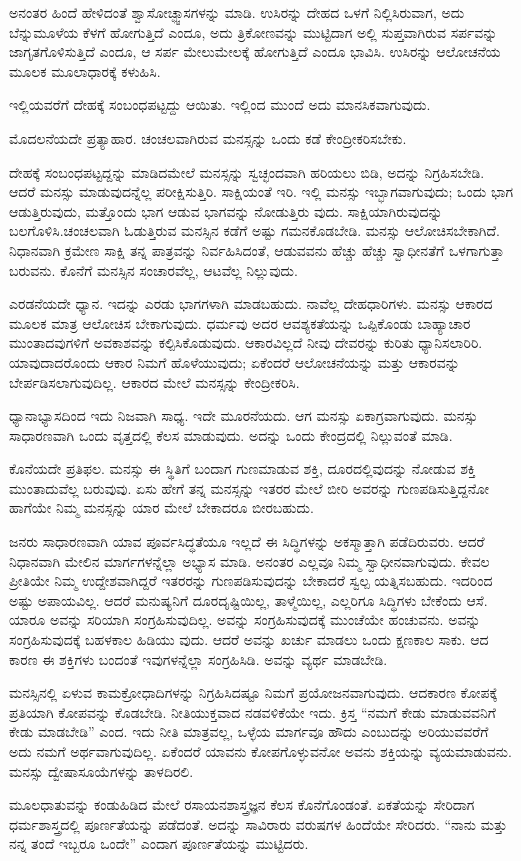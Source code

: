 ಅನಂತರ ಹಿಂದೆ ಹೇಳಿದಂತೆ ಶ್ವಾಸೋಚ್ಫ್ವಾಸಗಳನ್ನು ಮಾಡಿ. ಉಸಿರನ್ನು ದೇಹದ ಒಳಗೆ ನಿಲ್ಲಿಸಿರುವಾಗ, ಅದು ಬೆನ್ನುಮೂಳೆಯ ಕೆಳಗೆ ಹೋಗುತ್ತಿದೆ ಎಂದೂ, ಅದು ತ್ರಿಕೋಣವನ್ನು ಮುಟ್ಟಿದಾಗ ಅಲ್ಲಿ ಸುಪ್ತವಾಗಿರುವ ಸರ್ಪವನ್ನು ಜಾಗೃತಗೊಳಿಸುತ್ತಿದೆ ಎಂದೂ, ಆ ಸರ್ಪ ಮೇಲುಮೇಲಕ್ಕೆ ಹೋಗುತ್ತಿದೆ ಎಂದೂ ಭಾವಿಸಿ. ಉಸಿರನ್ನು ಆಲೋಚನೆಯ ಮೂಲಕ ಮೂಲಾಧಾರಕ್ಕೆ ಕಳುಹಿಸಿ.

ಇಲ್ಲಿಯವರೆಗೆ ದೇಹಕ್ಕೆ ಸಂಬಂಧಪಟ್ಟದ್ದು ಆಯಿತು. ಇಲ್ಲಿಂದ ಮುಂದೆ ಅದು ಮಾನಸಿಕವಾಗುವುದು.

ಮೊದಲನೆಯದೇ ಪ್ರತ್ಯಾಹಾರ. ಚಂಚಲವಾಗಿರುವ ಮನಸ್ಸನ್ನು ಒಂದು ಕಡೆ ಕೇಂದ್ರೀಕರಿಸಬೇಕು.

ದೇಹಕ್ಕೆ ಸಂಬಂಧಪಟ್ಟದ್ದನ್ನು ಮಾಡಿದಮೇಲೆ ಮನಸ್ಸನ್ನು ಸ್ವಚ್ಛಂದವಾಗಿ ಹರಿಯಲು ಬಿಡಿ, ಅದನ್ನು ನಿಗ್ರಹಿಸಬೇಡಿ. ಆದರೆ ಮನಸ್ಸು ಮಾಡುವುದನ್ನೆಲ್ಲ ಪರೀಕ್ಷಿಸುತ್ತಿರಿ. ಸಾಕ್ಷಿಯಂತೆ ಇರಿ. ಇಲ್ಲಿ ಮನಸ್ಸು ಇಬ್ಭಾಗವಾಗುವುದು; ಒಂದು ಭಾಗ ಆಡುತ್ತಿರುವುದು, ಮತ್ತೊಂದು ಭಾಗ ಆಡುವ ಭಾಗವನ್ನು ನೋಡುತ್ತಿರು ವುದು. ಸಾಕ್ಷಿಯಾಗಿರುವುದನ್ನು ಬಲಗೊಳಿಸಿ.ಚಂಚಲವಾಗಿ ಓಡುತ್ತಿರುವ ಮನಸ್ಸಿನ ಕಡೆಗೆ ಅಷ್ಟು ಗಮನಕೊಡಬೇಡಿ. ಮನಸ್ಸು ಆಲೋಚಿಸಬೇಕಾಗಿದೆ. ನಿಧಾನವಾಗಿ ಕ್ರಮೇಣ ಸಾಕ್ಷಿ ತನ್ನ ಪಾತ್ರವನ್ನು ನಿರ್ವಹಿಸಿದಂತೆ, ಆಡುವವನು ಹೆಚ್ಚು ಹೆಚ್ಚು ಸ್ವಾಧೀನತೆಗೆ ಒಳಗಾಗುತ್ತಾ ಬರುವನು. ಕೊನೆಗೆ ಮನಸ್ಸಿನ ಸಂಚಾರವೆಲ್ಲ, ಆಟವೆಲ್ಲ ನಿಲ್ಲುವುದು.

ಎರಡನೆಯದೇ ಧ್ಯಾನ. ಇದನ್ನು ಎರಡು ಭಾಗಗಳಾಗಿ ಮಾಡಬಹುದು. ನಾವೆಲ್ಲ ದೇಹಧಾರಿಗಳು. ಮನಸ್ಸು ಆಕಾರದ ಮೂಲಕ ಮಾತ್ರ ಆಲೋಚಿಸ ಬೇಕಾಗುವುದು. ಧರ್ಮವು ಅದರ ಆವಶ್ಯಕತೆಯನ್ನು ಒಪ್ಪಿಕೊಂಡು ಬಾಹ್ಯಾಚಾರ ಮುಂತಾದವುಗಳಿಗೆ ಅವಕಾಶವನ್ನು ಕಲ್ಪಿಸಿಕೊಡುವುದು. ಆಕಾರವಿಲ್ಲದೆ ನೀವು ದೇವರನ್ನು ಕುರಿತು ಧ್ಯಾನಿಸಲಾರಿರಿ. ಯಾವುದಾದರೊಂದು ಆಕಾರ ನಿಮಗೆ ಹೊಳೆಯುವುದು; ಏಕೆಂದರೆ ಆಲೋಚನೆಯನ್ನು ಮತ್ತು ಆಕಾರವನ್ನು ಬೇರ್ಪಡಿಸಲಾಗುವುದಿಲ್ಲ. ಆಕಾರದ ಮೇಲೆ ಮನಸ್ಸನ್ನು ಕೇಂದ್ರೀಕರಿಸಿ.

ಧ್ಯಾನಾಭ್ಯಾಸದಿಂದ ಇದು ನಿಜವಾಗಿ ಸಾಧ್ಯ. ಇದೇ ಮೂರನೆಯದು. ಆಗ ಮನಸ್ಸು ಏಕಾಗ್ರವಾಗುವುದು. ಮನಸ್ಸು ಸಾಧಾರಣವಾಗಿ ಒಂದು ವೃತ್ತದಲ್ಲಿ ಕೆಲಸ ಮಾಡುವುದು. ಅದನ್ನು ಒಂದು ಕೇಂದ್ರದಲ್ಲಿ ನಿಲ್ಲುವಂತೆ ಮಾಡಿ.

ಕೊನೆಯದೇ ಪ್ರತಿಫಲ. ಮನಸ್ಸು ಈ ಸ್ಥಿತಿಗೆ ಬಂದಾಗ ಗುಣಮಾಡುವ ಶಕ್ತಿ, ದೂರದಲ್ಲಿವುದನ್ನು ನೋಡುವ ಶಕ್ತಿ ಮುಂತಾದುವೆಲ್ಲ ಬರುವುವು. ಏಸು ಹೇಗೆ ತನ್ನ ಮನಸ್ಸನ್ನು ಇತರರ ಮೇಲೆ ಬೀರಿ ಅವರನ್ನು ಗುಣಪಡಿಸುತ್ತಿದ್ದನೋ ಹಾಗೆಯೇ ನಿಮ್ಮ ಮನಸ್ಸನ್ನು ಯಾರ ಮೇಲೆ ಬೇಕಾದರೂ ಬೀರಬಹುದು.

ಜನರು ಸಾಧಾರಣವಾಗಿ ಯಾವ ಪೂರ್ವಸಿದ್ಧತೆಯೂ ಇಲ್ಲದೆ ಈ ಸಿದ್ಧಿಗಳನ್ನು ಅಕಸ್ಮಾತ್ತಾಗಿ ಪಡೆದಿರುವರು. ಆದರೆ ನಿಧಾನವಾಗಿ ಮೇಲಿನ ಮಾರ್ಗಗಳನ್ನೆಲ್ಲಾ ಅಭ್ಯಾಸ ಮಾಡಿ. ಅನಂತರ ಎಲ್ಲವೂ ನಿಮ್ಮ ಸ್ವಾಧೀನವಾಗುವುದು. ಕೇವಲ ಪ್ರೀತಿಯೇ ನಿಮ್ಮ ಉದ್ದೇಶವಾಗಿದ್ದರೆ ಇತರರನ್ನು ಗುಣಪಡಿಸುವುದನ್ನು ಬೇಕಾದರೆ ಸ್ವಲ್ಪ ಯತ್ನಿಸಬಹುದು. ಇದರಿಂದ ಅಷ್ಟು ಅಪಾಯವಿಲ್ಲ. ಆದರೆ ಮನುಷ್ಯನಿಗೆ ದೂರದೃಷ್ಟಿಯಿಲ್ಲ, ತಾಳ್ಮೆಯಿಲ್ಲ, ಎಲ್ಲರಿಗೂ ಸಿದ್ಧಿಗಳು ಬೇಕೆಂದು ಆಸೆ. ಯಾರೂ ಅವನ್ನು ಸರಿಯಾಗಿ ಸಂಗ್ರಹಿಸುವುದಿಲ್ಲ. ಅವನ್ನು ಸಂಗ್ರಹಿಸುವುದಕ್ಕೆ ಮುಂಚೆಯೇ ಹಂಚುವನು. ಅವನ್ನು ಸಂಗ್ರಹಿಸುವುದಕ್ಕೆ ಬಹಳಕಾಲ ಹಿಡಿಯು ವುದು. ಆದರೆ ಅವನ್ನು ಖರ್ಚು ಮಾಡಲು ಒಂದು ಕ್ಷಣಕಾಲ ಸಾಕು. ಆದ ಕಾರಣ ಈ ಶಕ್ತಿಗಳು ಬಂದಂತೆ ಇವುಗಳನ್ನೆಲ್ಲಾ ಸಂಗ್ರಹಿಸಿಡಿ. ಅವನ್ನು ವ್ಯರ್ಥ ಮಾಡಬೇಡಿ.

ಮನಸ್ಸಿನಲ್ಲಿ ಏಳುವ ಕಾಮಕ್ರೋಧಾದಿಗಳನ್ನು ನಿಗ್ರಹಿಸಿದಷ್ಟೂ ನಿಮಗೆ ಪ್ರಯೋಜನವಾಗುವುದು. ಆದಕಾರಣ ಕೋಪಕ್ಕೆ ಪ್ರತಿಯಾಗಿ ಕೋಪವನ್ನು ಕೊಡಬೇಡಿ. ನೀತಿಯುಕ್ತವಾದ ನಡವಳಿಕೆಯೇ ಇದು. ಕ್ರಿಸ್ತ “ನಮಗೆ ಕೇಡು ಮಾಡುವವನಿಗೆ ಕೇಡು ಮಾಡಬೇಡಿ” ಎಂದ. ಇದು ನೀತಿ ಮಾತ್ರವಲ್ಲ, ಒಳ್ಳೆಯ ಮಾರ್ಗವೂ ಹೌದು ಎಂಬುದನ್ನು ಅರಿಯುವವರೆಗೆ ಅದು ನಮಗೆ ಅರ್ಥವಾಗುವುದಿಲ್ಲ. ಏಕೆಂದರೆ ಯಾವನು ಕೋಪಗೊಳ್ಳುವನೋ ಅವನು ಶಕ್ತಿಯನ್ನು ವ್ಯಯಮಾಡುವನು. ಮನಸ್ಸು ದ್ವೇಷಾಸೂಯೆಗಳನ್ನು ತಾಳದಿರಲಿ.

ಮೂಲಧಾತುವನ್ನು ಕಂಡುಹಿಡಿದ ಮೇಲೆ ರಸಾಯನಶಾಸ್ತ್ರಜ್ಞನ ಕೆಲಸ ಕೊನೆಗೊಂಡಂತೆ. ಏಕತೆಯನ್ನು ಸೇರಿದಾಗ ಧರ್ಮಶಾಸ್ತ್ರದಲ್ಲಿ ಪೂರ್ಣತೆಯನ್ನು ಪಡೆದಂತೆ. ಅದನ್ನು ಸಾವಿರಾರು ವರುಷಗಳ ಹಿಂದೆಯೇ ಸೇರಿದರು. “ನಾನು ಮತ್ತು ನನ್ನ ತಂದೆ ಇಬ್ಬರೂ ಒಂದೇ” ಎಂದಾಗ ಪೂರ್ಣತೆಯನ್ನು ಮುಟ್ಟಿದರು.

